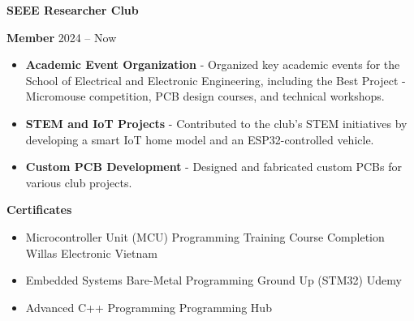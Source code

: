 \documentclass[11pt]{article}
\begin{document}
\vspace{12pt}

\textbf{SEEE Researcher Club} \hfill

\textbf{Member} \hfill 2024 – Now
\begin{itemize}[noitemsep, topsep=0pt, partopsep=0pt, parsep=0pt]
    \item \textbf{Academic Event Organization} - Organized key academic events for the School of Electrical and Electronic Engineering, including the Best Project - Micromouse competition, PCB design courses, and technical workshops.
    \item \textbf{STEM and IoT Projects} - Contributed to the club's STEM initiatives by developing a smart IoT home model and an ESP32-controlled vehicle.
    \item \textbf{Custom PCB Development} - Designed and fabricated custom PCBs for various club projects.
\end{itemize}




\begin{center}
    \textbf{Certificates}
\end{center}


\begin{itemize}[noitemsep, topsep=0pt, partopsep=0pt, parsep=0pt]
    \item Microcontroller Unit (MCU) Programming Training Course Completion \hfill Willas Electronic Vietnam
    \item Embedded Systems Bare-Metal Programming Ground Up (STM32) \hfill Udemy
    \item Advanced C++ Programming \hfill Programming Hub
    
    
\end{itemize}
\end{document}
